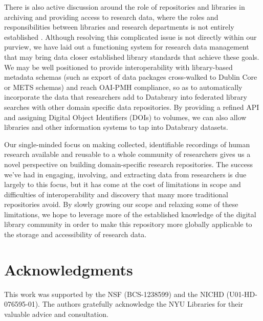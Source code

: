 \documentclass{sig-alternate}
\begin{document}
There is also active discussion around the role of repositories and libraries in archiving and providing access to research data, where the roles and responsibilities between libraries and research departments is not entirely established \cite{Castelli_etal_2013, Nielson_Hjørland_2014, Macmillan_2014, Pinfield_etal_2014}.
Although resolving this complicated issue is not directly within our purview, we have laid out a functioning system for research data management that may bring data closer established library standards that achieve these goals.
We may be well positioned to provide interoperability with library-based metadata schemas (such as export of data packages cross-walked to Dublin Core or METS schemas) and reach OAI-PMH compliance, so as to automatically incorporate the data that researchers add to Databrary into federated library searches with other domain specific data repositories.
By providing a refined API and assigning Digital Object Identifiers (DOIs) to volumes, we can also allow libraries and other information systems to tap into Databrary datasets.

Our single-minded focus on making collected, identifiable recordings of human research available and reusable to a whole community of researchers gives us a novel perspective on building domain-specific research repositories.
The success we've had in engaging, involving, and extracting data from researchers is due largely to this focus, but it has come at the cost of limitations in scope and difficulties of interoperability and discovery that many more traditional repositories avoid.
By slowly growing our scope and relaxing some of these limitations, we hope to leverage more of the established knowledge of the digital library community in order to make this repository more globally applicable to the storage and accessibility of research data.

\section*{Acknowledgments}

This work was supported by the NSF (BCS-1238599) and the NICHD (U01-HD-076595-01).
The authors gratefully acknowledge the NYU Libraries for their valuable advice and consultation.



\end{document}

